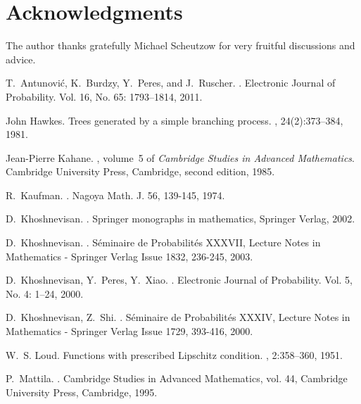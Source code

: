 \documentclass[11pt, reqno]{amsart}
\theoremstyle{plain}
\theoremstyle{definition}
\theoremstyle{remark}
\begin{document}
\section*{Acknowledgments}
The author thanks gratefully Michael Scheutzow for very fruitful discussions and advice. 

\begin{thebibliography}{4}

T.~Antunovi\'{c}, K.~Burdzy, Y.~Peres, and J.~Ruscher.
.
\newblock Electronic Journal of Probability. Vol. 16, No. 65: 1793--1814, 2011.

John Hawkes.
\newblock Trees generated by a simple branching process.
, 24(2):373--384, 1981.

Jean-Pierre Kahane.
, volume~5 of {\em Cambridge
  Studies in Advanced Mathematics}.
\newblock Cambridge University Press, Cambridge, second edition, 1985.

R.~Kaufman.
.
\newblock Nagoya Math. J. 56, 139-145, 1974.

D.~Khoshnevisan.
.
\newblock Springer monographs in mathematics, Springer Verlag, 2002.

D.~Khoshnevisan.
.
\newblock S\'{e}minaire de Probabilit\'{e}s XXXVII, Lecture Notes in Mathematics - Springer Verlag Issue 1832, 236-245, 2003.

D.~Khoshnevisan, Y.~Peres, Y.~Xiao.
.
\newblock Electronic Journal of Probability. Vol. 5, No. 4: 1--24, 2000.

D.~Khoshnevisan, Z.~Shi.
.
\newblock S\'{e}minaire de Probabilit\'{e}s XXXIV, Lecture Notes in Mathematics - Springer Verlag Issue 1729, 393-416, 2000.

W.~S. Loud.
\newblock Functions with prescribed {L}ipschitz condition.
, 2:358--360, 1951.

P.~Mattila.
.
\newblock Cambridge Studies in Advanced Mathematics, vol. 44, Cambridge University Press, Cambridge, 1995.


\end{thebibliography}
\end{document}
